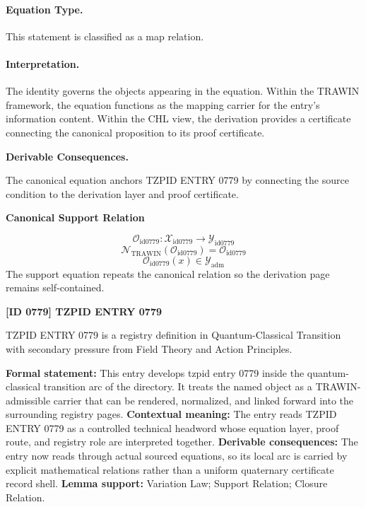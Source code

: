 \paragraph{Equation Type.}
This statement is classified as a map relation.

\paragraph{Interpretation.}
The identity governs the objects appearing in the equation. Within the TRAWIN framework, the equation functions as the mapping carrier for the entry’s information content. Within the CHL view, the derivation provides a certificate connecting the canonical proposition to its proof certificate.

\par\vspace{0.35em}
\noindent\textbf{Derivable Consequences.}\quad
\begingroup
\footnotesize
\raggedright
The canonical equation anchors TZPID ENTRY 0779 by connecting the source condition to the derivation layer and proof certificate.
\par\endgroup

\noindent\textbf{Canonical Support Relation}\par
\[
\mathcal{O}_{\mathrm{id0779}}:\mathcal{X}_{\mathrm{id0779}}\longrightarrow\mathcal{Y}_{\mathrm{id0779}}
\]
\[
\mathcal{N}_{\mathrm{TRAWIN}}(\mathcal{O}_{\mathrm{id0779}})=\mathcal{O}_{\mathrm{id0779}}
\]
\[
\mathcal{O}_{\mathrm{id0779}}(x)\in\mathcal{Y}_{\mathrm{adm}}
\]
\noindent The support equation repeats the canonical relation so the derivation page remains self-contained.\par

\clearpage
\noindent\textbf{[ID 0779] TZPID ENTRY 0779}\par
\vspace{0.35em}
\begingroup\small
{}
TZPID ENTRY 0779 is a registry definition in Quantum-Classical Transition with secondary pressure from Field Theory and Action Principles.

\begingroup\footnotesize\setlength{\emergencystretch}{3em}\sloppy
\textbf{Formal statement:} This entry develops tzpid entry 0779 inside the quantum-classical transition arc of the directory. It treats the named object as a TRAWIN-admissible carrier that can be rendered, normalized, and linked forward into the surrounding registry pages. \textbf{Contextual meaning:} The entry reads TZPID ENTRY 0779 as a controlled technical headword whose equation layer, proof route, and registry role are interpreted together. \textbf{Derivable consequences:} The entry now reads through actual sourced equations, so its local arc is carried by explicit mathematical relations rather than a uniform quaternary certificate record shell. \textbf{Lemma support:} Variation Law; Support Relation; Closure Relation.\par
\endgroup

